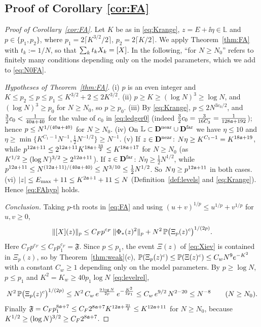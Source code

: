 \subsection{Proof of Corollary \ref{cor:FA}}\label{sec:FAcor}
\begin{proof}[Proof of Corollary~\ref{cor:FA}]
Let $K$ be as in \eqref{eq:Krange}, $z=E+\ii\eta\in\mathbb L$ and $p\in\{p_1,p_2\}$, where $p_1=2\lceil K^{3/2}/2\rceil$, $p_2=2\lceil K/2\rceil$. We apply Theorem~\ref{thm:FA} with $t_k:=1/N$, so that $\sum_kt_kX_k=[X]$.
In the following, ``for $N\ge N_0$'' refers to finitely many conditions depending only on the model parameters, which we add to \eqref{eq:N0FA}.

\emph{Hypotheses of Theorem~\ref{thm:FA}.} (i) $p$ is an even integer and $K\le p_2\le p\le p_1\le K^{3/2}+2\le2K^{3/2}$. (ii) $p\ge K\ge(\log N)^3\ge\log N$, and $(\log N)^3\ge p_0$ for $N\ge N_0$, so $p\ge p_0$. (iii) By \eqref{eq:Krange}, $p\le2N^{3c_0/2}$, and $\frac32c_0<\frac1{40\mathfrak{a}+40}$ for the value of $c_0$ in \eqref{eq:ledger0}
(indeed $\frac32c_0=\frac{3}{16C_3}=\frac1{128\mathfrak{a}+192}$); hence $p\le N^{1/(40\mathfrak{a}+40)}$ for $N\ge N_0$. (iv) On $\mathbb L\subset\mathbf{D}^{\rm near}\cup\mathbf{D}^{\rm far}$ we have $\eta\le10$ and $\eta\ge\min\{K^{C_1-1}N^{-1},\frac12N^{-1/2}\}\ge N^{-1}$.
(v) If $z\in\mathbf{D}^{\rm near}$: $N\eta\ge K^{C_1-1}=K^{18\mathfrak{a}+19}$, while $p^{12\mathfrak{a}+11}\le2^{12\mathfrak{a}+11}K^{18\mathfrak{a}+\frac{33}2}\le K^{18\mathfrak{a}+17}$ for $N\ge N_0$ (as $K^{1/2}\ge(\log N)^{3/2}\ge2^{12\mathfrak{a}+11}$). If $z\in\mathbf{D}^{\rm far}$: $N\eta\ge\frac12N^{1/2}$, while
$p^{12\mathfrak{a}+11}\le N^{(12\mathfrak{a}+11)/(40\mathfrak{a}+40)}\le N^{3/10}\le\frac12N^{1/2}$. So $N\eta\ge p^{12\mathfrak{a}+11}$ in both cases. (vi) $|z|\le E_{\max}+11\le K^{2\mathfrak{a}+1}+11\le N$ (Definition~\ref{def:levels} and \eqref{eq:Krange}).
Hence \eqref{eq:FAhyp} holds.

\emph{Conclusion.} Taking $p$-th roots in \eqref{eq:FA} and using $(u+v)^{1/p}\le u^{1/p}+v^{1/p}$ for $u,v\ge0$,
\[
 \|[X](z)\|_p\le C_Fp^{c_F}\,\|\Phi_*(z)^2\|_p+N^2\,\mathbb{P}\big(\Xi_p(z)^c\big)^{1/(2p)} .
\]
Here $C_Fp^{c_F}\le C_Fp_1^{c_F}=\mathfrak F$. Since $p\le p_1$, the event $\Xi(z)$ of \eqref{eq:Xiev} is contained in $\Xi_p(z)$, so by Theorem~\ref{thm:weak}(c), $\mathbb{P}(\Xi_p(z)^c)\le\mathbb{P}(\Xi(z)^c)\le C_wN^9e^{-K^2}$ with a constant $C_w\ge1$ depending only on the model parameters. By $p\ge\log N$, $p\le p_1$ and
$K^2=K_w\ge40p_1\log N$ \eqref{eq:levelrel},
\[
 N^2\,\mathbb{P}\big(\Xi_p(z)^c\big)^{1/(2p)}\le N^2\,C_w\,e^{\frac{9\log N}{2p}}\,e^{-\frac{K^2}{2p_1}}\le C_w\,e^{9/2}\,N^{2-20}\le N^{-8}\qquad(N\ge N_0).
\]
Finally $\mathfrak F=C_Fp_1^{8\mathfrak{a}+7}\le C_F2^{8\mathfrak{a}+7}K^{12\mathfrak{a}+\frac{21}2}\le K^{12\mathfrak{a}+11}$ for $N\ge N_0$, because $K^{1/2}\ge(\log N)^{3/2}\ge C_F2^{8\mathfrak{a}+7}$.
\end{proof}

